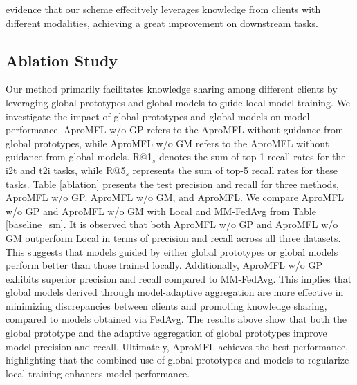 \noindent evidence that our scheme effecitvely leverages knowledge from clients with different modalities, achieving a great improvement on downstream tasks. 






\subsection{Ablation Study}
Our method primarily facilitates knowledge sharing among different clients by leveraging global prototypes and global models to guide local model training. 
We investigate the impact of global prototypes and global models on model performance. 
AproMFL w/o GP refers to the AproMFL without guidance from global prototypes, while AproMFL w/o GM refers to the AproMFL without guidance from global models. 
R@1$_s$ denotes the sum of top-1 recall rates for the i2t and t2i tasks, while R@5$_s$ represents the sum of top-5 recall rates for these tasks.
Table \ref{ablation} presents the test precision and recall for three methods, AproMFL w/o GP, AproMFL w/o GM, and AproMFL. 
We compare AproMFL w/o GP and AproMFL w/o GM with Local and MM-FedAvg from Table \ref{baseline_sm}. 
It is observed that both AproMFL w/o GP and AproMFL w/o GM outperform Local in terms of precision and recall across all three datasets. This suggests that models guided by either global prototypes or global models perform better than those trained locally. Additionally, AproMFL w/o GP exhibits superior precision and recall compared to MM-FedAvg. This implies that global models derived through model-adaptive aggregation are more effective in minimizing discrepancies between clients and promoting knowledge sharing, compared to models obtained via FedAvg. 
The results above show that both the global prototype and the adaptive aggregation of global prototypes improve model precision and recall. Ultimately, AproMFL achieves the best performance, highlighting that the combined use of global prototypes and models to regularize local training enhances model performance.








